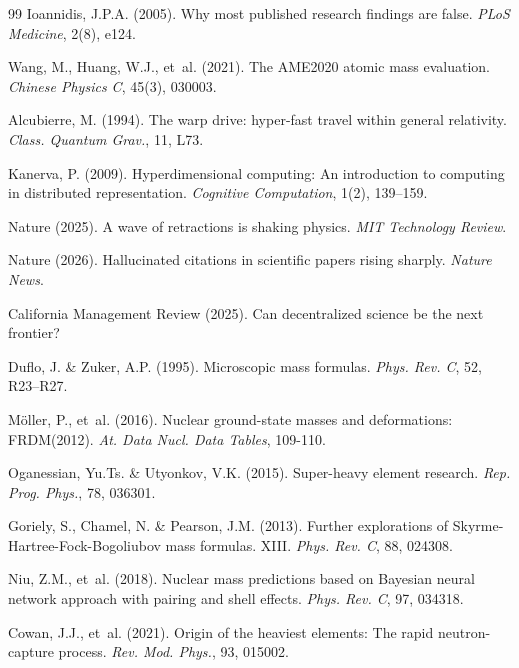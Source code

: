 \documentclass[letterpaper,11pt]{article}
\begin{document}
\begin{thebibliography}{99}
 Ioannidis, J.P.A. (2005).
Why most published research findings are false. \textit{PLoS Medicine}, 2(8), e124.

 Wang, M., Huang, W.J., et~al. (2021).
The AME2020 atomic mass evaluation. \textit{Chinese Physics C}, 45(3), 030003.

 Alcubierre, M. (1994).
The warp drive: hyper-fast travel within general relativity. \textit{Class. Quantum Grav.}, 11, L73.

 Kanerva, P. (2009).
Hyperdimensional computing: An introduction to computing in distributed representation. \textit{Cognitive Computation}, 1(2), 139--159.

 Nature (2025).
A wave of retractions is shaking physics. \textit{MIT Technology Review}.

 Nature (2026).
Hallucinated citations in scientific papers rising sharply. \textit{Nature News}.

 California Management Review (2025).
Can decentralized science be the next frontier?

 Duflo, J. \& Zuker, A.P. (1995).
Microscopic mass formulas. \textit{Phys. Rev. C}, 52, R23--R27.

 M\"oller, P., et~al. (2016).
Nuclear ground-state masses and deformations: FRDM(2012). \textit{At. Data Nucl. Data Tables}, 109-110.

 Oganessian, Yu.Ts. \& Utyonkov, V.K. (2015).
Super-heavy element research. \textit{Rep. Prog. Phys.}, 78, 036301.

 Goriely, S., Chamel, N. \& Pearson, J.M. (2013).
Further explorations of Skyrme-Hartree-Fock-Bogoliubov mass formulas. XIII. \textit{Phys. Rev. C}, 88, 024308.

 Niu, Z.M., et~al. (2018).
Nuclear mass predictions based on Bayesian neural network approach with pairing and shell effects. \textit{Phys. Rev. C}, 97, 034318.

 Cowan, J.J., et~al. (2021).
Origin of the heaviest elements: The rapid neutron-capture process. \textit{Rev. Mod. Phys.}, 93, 015002.


\end{thebibliography}
\end{document}
